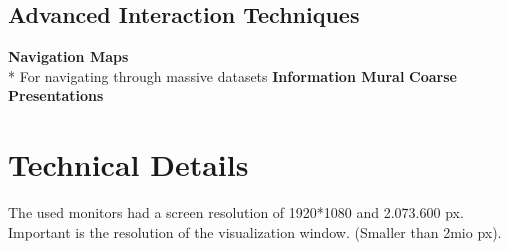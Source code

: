 \subsection{Advanced Interaction Techniques}
\textbf{Navigation Maps}\\*
For navigating through massive datasets 
\textbf{Information Mural}
\textbf{Coarse Presentations}



\section{Technical Details}
The used monitors had a screen resolution of 1920*1080 and  2.073.600 px.  
Important is the resolution of the visualization window. (Smaller than 2mio px).
